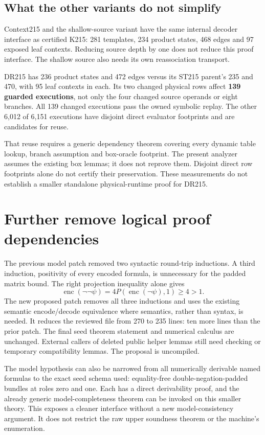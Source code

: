 \documentclass[11pt]{article}
\begin{document}
\subsection{What the other variants do not simplify}
Context215 and the shallow-source variant have the same internal decoder interface as certified K215: 281 templates, 234 product states, 468 edges and 97 exposed leaf contexts. Reducing source depth by one does not reduce this proof interface. The shallow source also needs its own reassociation transport.

DR215 has 236 product states and 472 edges versus its ST215 parent's 235 and 470, with 95 leaf contexts in each. Its two changed physical rows affect \textbf{139 guarded executions}, not only the four changed source operands or eight branches. All 139 changed executions pass the owned symbolic replay. The other 6,012 of 6,151 executions have disjoint direct evaluator footprints and are candidates for reuse.

That reuse requires a generic dependency theorem covering every dynamic table lookup, branch assumption and box-oracle footprint. The present analyzer assumes the existing box lemmas; it does not reprove them. Disjoint direct row footprints alone do not certify their preservation. These measurements do not establish a smaller standalone physical-runtime proof for DR215.

\section{Further remove logical proof dependencies}
The previous model patch removed two syntactic round-trip inductions. A third induction, positivity of every encoded formula, is unnecessary for the padded matrix bound. The right projection inequality alone gives
\[
 \operatorname{enc}(\neg\neg\psi)
 =4P(\operatorname{enc}(\neg\psi),1)\ge4>1.
\]
The new proposed patch removes all three inductions and uses the existing semantic encode/decode equivalence where semantics, rather than syntax, is needed. It reduces the reviewed file from 270 to 235 lines: ten more lines than the prior patch. The final seed theorem statement and numerical calculus are unchanged. External callers of deleted public helper lemmas still need checking or temporary compatibility lemmas. The proposal is uncompiled.

The model hypothesis can also be narrowed from all numerically derivable named formulas to the exact seed schema used: equality-free double-negation-padded bundles at roles zero and one. Each has a direct derivability proof, and the already generic model-completeness theorem can be invoked on this smaller theory. This exposes a cleaner interface without a new model-consistency argument. It does not restrict the raw upper soundness theorem or the machine's enumeration.
\end{document}
